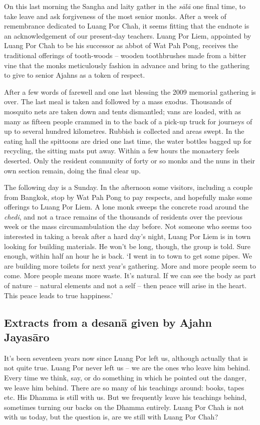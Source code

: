 On this last morning the Sangha and laity gather in the \emph{sālā} one
final time, to take leave and ask forgiveness of the most senior monks. 
After a week of remembrance dedicated to Luang Por Chah, it seems
fitting that the endnote is an acknowledgement of our present-day
teachers. Luang Por Liem, appointed by Luang Por Chah to be his
successor as abbot of Wat Pah Pong, receives the traditional offerings
of tooth-woods -- wooden toothbrushes made from a bitter vine that the
monks meticulously fashion in advance and bring to the gathering to give
to senior Ajahns as a token of respect. 

After a few words of farewell and one last blessing the 2009 memorial
gathering is over. The last meal is taken and followed by a mass exodus. 
Thousands of mosquito nets are taken down and tents dismantled; vans are
loaded, with as many as fifteen people crammed in to the back of a
pick-up truck for journeys of up to several hundred kilometres. Rubbish
is collected and areas swept. In the eating hall the spittoons are dried
one last time, the water bottles bagged up for recycling, the sitting
mats put away. Within a few hours the monastery feels deserted. Only the
resident community of forty or so monks and the nuns in their own
section remain, doing the final clear up. 

The following day is a Sunday. In the afternoon some visitors, including
a couple from Bangkok, stop by Wat Pah Pong to pay respects, and
hopefully make some offerings to Luang Por Liem. A lone monk sweeps the
concrete road around the \emph{chedi}, and not a trace remains of the
thousands of residents over the previous week or the mass
circumambulation the day before. Not someone who seems too interested in
taking a break after a hard day's night, Luang Por Liem is in town
looking for building materials. He won't be long, though, the group is
told. Sure enough, within half an hour he is back. `I went in to town to
get some pipes. We are building more toilets for next year's gathering. 
More and more people seem to come. More people means more waste. It's
natural. If we can see the body as part of nature -- natural elements
and not a self -- then peace will arise in the heart. This peace leads
to true happiness.'

\subsection*{Extracts from a desanā given by Ajahn Jayasāro}

It's been seventeen years now since Luang Por left us, although actually
that is not quite true. Luang Por never left us -- we are the ones who
leave him behind. Every time we think, say, or do something in which he
pointed out the danger, we leave him behind. There are so many of his
teachings around: books, tapes etc. His Dhamma is still with us. But we
frequently leave his teachings behind, sometimes turning our backs on
the Dhamma entirely. Luang Por Chah is not with us today, but the
question is, are we still with Luang Por Chah? 

